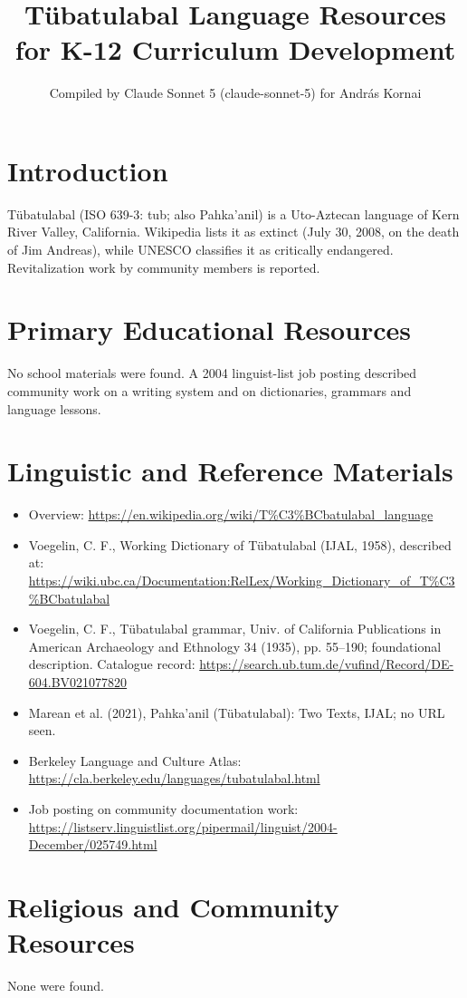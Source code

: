 \documentclass[12pt]{article}
\title{T\"ubatulabal Language Resources for K-12 Curriculum Development}
\author{Compiled by Claude Sonnet 5 (claude-sonnet-5) for Andr\'as Kornai}
\date{}
\begin{document}
\maketitle

\section{Introduction}
T\"ubatulabal (ISO 639-3: tub; also Pahka'anil) is a Uto-Aztecan language of Kern River Valley, California. Wikipedia lists it as extinct (July 30, 2008, on the death of Jim Andreas), while UNESCO classifies it as critically endangered. Revitalization work by community members is reported.

\section{Primary Educational Resources}
No school materials were found. A 2004 linguist-list job posting described community work on a writing system and on dictionaries, grammars and language lessons.

\section{Linguistic and Reference Materials}
\begin{itemize}
\item Overview: \url{https://en.wikipedia.org/wiki/T%C3%BCbatulabal_language}
\item Voegelin, C. F., Working Dictionary of T\"ubatulabal (IJAL, 1958), described at: \url{https://wiki.ubc.ca/Documentation:RelLex/Working_Dictionary_of_T%C3%BCbatulabal}
\item Voegelin, C. F., T\"ubatulabal grammar, Univ. of California Publications in American Archaeology and Ethnology 34 (1935), pp. 55--190; foundational description. Catalogue record: \url{https://search.ub.tum.de/vufind/Record/DE-604.BV021077820}
\item Marean et al. (2021), Pahka'anil (T\"ubatulabal): Two Texts, IJAL; no URL seen.
\item Berkeley Language and Culture Atlas: \url{https://cla.berkeley.edu/languages/tubatulabal.html}
\item Job posting on community documentation work: \url{https://listserv.linguistlist.org/pipermail/linguist/2004-December/025749.html}
\end{itemize}

\section{Religious and Community Resources}
None were found.
\end{document}

